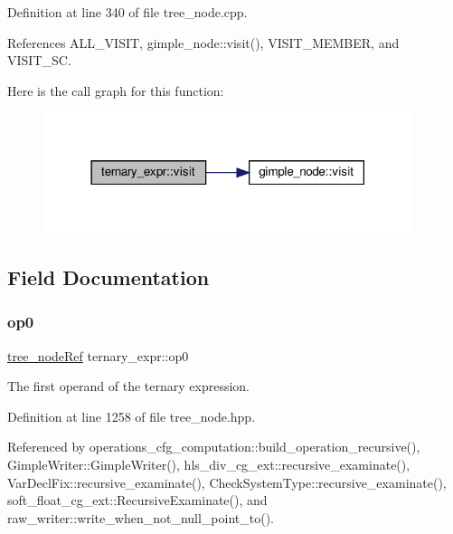 Definition at line 340 of file tree\+\_\+node.\+cpp.



References A\+L\+L\+\_\+\+V\+I\+S\+IT, gimple\+\_\+node\+::visit(), V\+I\+S\+I\+T\+\_\+\+M\+E\+M\+B\+ER, and V\+I\+S\+I\+T\+\_\+\+SC.

Here is the call graph for this function\+:
\nopagebreak
\begin{figure}[H]
\begin{center}
\leavevmode
\includegraphics[width=306pt]{df/df1/structternary__expr_a3bb8b37b29b4cb797c4872c773184f5b_cgraph}
\end{center}
\end{figure}


\subsection{Field Documentation}
\mbox{\label{structternary__expr_a84c7843e200270533e0f6d919afd04c2}} 
\subsubsection{\texorpdfstring{op0}{op0}}
{\footnotesize\ttfamily \hyperlink{tree__node_8hpp_a6ee377554d1c4871ad66a337eaa67fd5}{tree\+\_\+node\+Ref} ternary\+\_\+expr\+::op0}



The first operand of the ternary expression. 



Definition at line 1258 of file tree\+\_\+node.\+hpp.



Referenced by operations\+\_\+cfg\+\_\+computation\+::build\+\_\+operation\+\_\+recursive(), Gimple\+Writer\+::\+Gimple\+Writer(), hls\+\_\+div\+\_\+cg\+\_\+ext\+::recursive\+\_\+examinate(), Var\+Decl\+Fix\+::recursive\+\_\+examinate(), Check\+System\+Type\+::recursive\+\_\+examinate(), soft\+\_\+float\+\_\+cg\+\_\+ext\+::\+Recursive\+Examinate(), and raw\+\_\+writer\+::write\+\_\+when\+\_\+not\+\_\+null\+\_\+point\+\_\+to().

